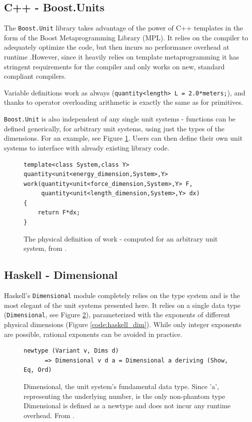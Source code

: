 \documentclass[12pt,oneside,a4paper]{scrbook}
\begin{document}
\subsection{C++ - Boost.Units}

The \verb/Boost.Unit/ library takes advantage of the power of C++ templates in the form of the Boost Metaprogramming Library (MPL).  It relies on the compiler to adequately optimize the code, but then incurs no performance overhead at runtime \citep{Schabel10}.However, since it heavily relies on template metaprogramming it has stringent requirements for the compiler and only works on new, standard compliant compilers.

Variable definitions work as always (\verb/quantity<length> L = 2.0*meters;/), and thanks to operator overloading arithmetic is exactly the same as for primitives.

\verb/Boost.Unit/ is also independent of any single unit systems - functions can be defined generically, for arbitrary unit systems, using just the types of the dimensions. For an example, see Figure \ref{code:boost_units_generic}. Users can then define their own unit systems to interface with already existing library code.

\begin{figure}
\begin{verbatim}
template<class System,class Y>
quantity<unit<energy_dimension,System>,Y>
work(quantity<unit<force_dimension,System>,Y> F,
     quantity<unit<length_dimension,System>,Y> dx)
{
    return F*dx;
}
\end{verbatim}
\caption{The physical definition of work - computed for an arbitrary unit system, from \citep{Schabel10}.}
\label{code:boost_units_generic}
\end{figure}


\subsection{Haskell - Dimensional}
Haskell's \verb/Dimensional/ module \citep{Buckwalter06} completely relies on the type system and is the most elegant of the unit systems presented here. It relies on a single data type (\verb/Dimensional/, see Figure \ref{code:haskell_dimensional}), parameterized with the exponents of different physical dimensions (Figure \ref{code:haskell_dim}). While only integer exponents are possible, rational exponents can be avoided in practice.

\begin{figure}
\begin{verbatim}
newtype (Variant v, Dims d)
      => Dimensional v d a = Dimensional a deriving (Show, Eq, Ord)
\end{verbatim}
\caption{Dimensional, the unit system's fundamental data type. Since 'a', representing the underlying number, is the only non-phantom type Dimensional is defined as a newtype and does not incur any runtime overhead. From \citep{Buckwalter06}.}
\label{code:haskell_dimensional}
\end{figure}
\end{document}
